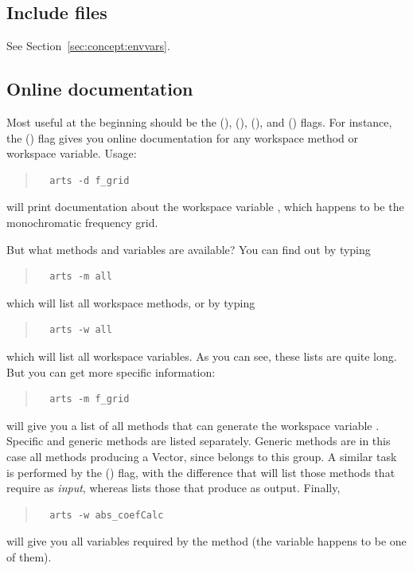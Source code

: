 \subsection*{Include files}
%
See Section~\ref{sec:concept:envvars}.


\subsection*{Online documentation}
%
Most useful at the beginning should be the 
(),  (), 
(), and  () flags.
For instance, the  () flag gives you online
documentation for any workspace method or workspace variable. Usage:
\begin{quote}
\begin{verbatim}
  arts -d f_grid
\end{verbatim}
\end{quote}
will print documentation about the workspace variable , which
happens to be the monochromatic frequency grid.

But what methods and variables are available? You can find out by
typing
\begin{quote}
\begin{verbatim}
  arts -m all
\end{verbatim}
\end{quote}
which will list all workspace methods, or by typing 
\begin{quote}
\begin{verbatim}
  arts -w all
\end{verbatim}
\end{quote}
which will list all workspace variables. As you can see, these lists
are quite long. But you can get more specific information:
\begin{quote}
\begin{verbatim}
  arts -m f_grid
\end{verbatim}
\end{quote}
will give you a list of all methods that can generate the workspace
variable . Specific and generic methods are listed
separately. Generic methods are in this case all methods producing a
Vector, since  belongs to this group. A similar task is
performed by the  () flag, with the difference
that  will list those methods that require
 as \emph{input}, whereas  lists
those that produce  as output. Finally,
\begin{quote}
\begin{verbatim}
  arts -w abs_coefCalc
\end{verbatim}
\end{quote}
will give you all variables required by the method 
(the variable  happens to be one of them).

